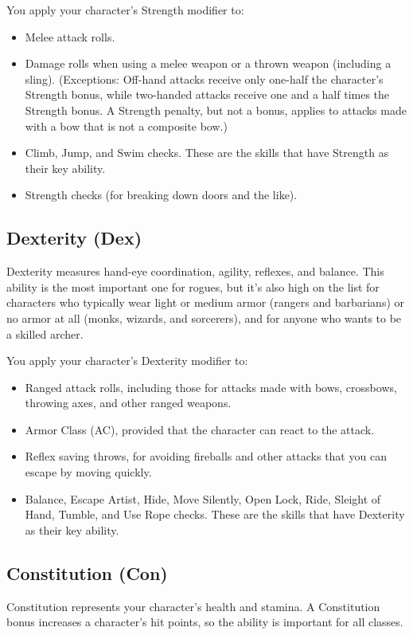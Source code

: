 \documentclass[10pt,a4paper,twocolumn]{d20}
\begin{document}
You apply your character’s Strength modifier to:
\begin{itemize}
\item Melee attack rolls.
\item Damage rolls when using a melee weapon or a thrown weapon (including a sling). (Exceptions: Off-hand attacks receive only one-half the character’s Strength bonus, while two-handed attacks receive one and a half times the Strength bonus. A Strength penalty, but not a bonus, applies to attacks made with a bow that is not a composite bow.)
\item Climb, Jump, and Swim checks. These are the skills that have Strength as their key ability.
\item Strength checks (for breaking down doors and the like).
\end{itemize}

\subsection{Dexterity (Dex)}
Dexterity measures hand-eye coordination, agility, reflexes, and balance. This ability is the most important one for rogues, but it’s also high on the list for characters who typically wear light or medium armor (rangers and barbarians) or no armor at all (monks, wizards, and sorcerers), and for anyone who wants to be a skilled archer.

You apply your character’s Dexterity modifier to:
\begin{itemize}
\item Ranged attack rolls, including those for attacks made with bows, crossbows, throwing axes, and other ranged weapons.
\item Armor Class (AC), provided that the character can react to the attack.
\item Reflex saving throws, for avoiding fireballs and other attacks that you can escape by moving quickly.
\item Balance, Escape Artist, Hide, Move Silently, Open Lock, Ride, Sleight of Hand, Tumble, and Use Rope checks. These are the skills that have Dexterity as their key ability.
\end{itemize}
\subsection{Constitution (Con)}
Constitution represents your character’s health and stamina. A Constitution bonus increases a character’s hit points, so the ability is important for all classes.
\end{document}
